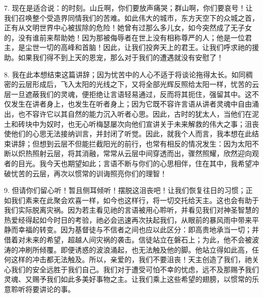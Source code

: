 7. 现在是适合说：的时刻。山丘啊，你们要放声痛哭；群山啊，你们要哀号！让我们召唤整个受造界同情我们的苦难。如此伟大的城市，东方天空下的众城之首，正有从文明世界中心被拔除的危险！她曾有过那么多儿女，如今突然成了无子女的，没有谁前来帮助她！因为那被侮辱者在世上没有相称尊严的人；他是一位君主，是尘世一切的高峰和首脑！因此，让我们投奔天上的君王。让我们呼求祂的援助。如果我们得不到上天的恩宠，那么对于我们的遭遇就没有安慰了！\par

8. 我在此本想结束这篇讲辞；因为忧苦中的人心不适于将谈论拖得太长。如同稠密的云层形成后，飞入太阳的光线之下，又将全部光辉反照给太阳一样，忧苦的云层一旦遮蔽我们的灵魂，便拒绝让言语轻易通过，反而将其扼住，强留其中。这不仅发生在讲者身上，也发生在听者身上；因为它既不容许言语从讲者灵魂中自由涌出，也不容许它以其自然的能力沉入听者心思。因此，古时的犹太人，当他们在泥土和砖块中为奴时，也无心听梅瑟屡次向他们宣讲关于未来解救的伟大之事；沮丧使他们的心思无法接纳训言，并封闭了听觉。因此，就我个人而言，我本想在此结束讲辞；但想到云层不但能拦截阳光的前行，也常有相反的情况发生：因为太阳不断以炽热照射云层，将其消融，常常从云层中间穿透而出，骤然照耀，欣然迎向观者的目光。我今天也期望如此；言语不断与你们的心思相伴，住在其中，我希望冲破忧苦的云层，再次以惯常的训诲照亮你们的理智！\par

9. 但请你们留心听！暂且侧耳倾听！摆脱这沮丧吧！让我们恢复往日的习惯；正如我们素来在此聚会欢喜一样，如今也这样行，将一切交托给天主。这也会有助于我们实际脱离灾祸。因为若主看见祂的言语被用心聆听，并看见我们对神圣智慧的热爱经得起如今时日的考验，祂必会迅速再次扶起我们，从眼前的暴风雨中带来平静而幸福的转变。因为基督徒与不信者之间也应以此区分：即高贵地承当一切；并借着对未来的希望，超越人间灾祸的袭击。信徒站立在磐石上；为此，他不会被波涛的冲刷所倾覆。即便诱惑的波浪涌起，也无法触及他的脚。他站立得如此高，任何这样的冲击都无法触及。所以，亲爱的，我们不要沮丧！天主创造了我们，祂关心我们的安全远胜于我们自己。我们对于遭受可怕不幸的忧虑，远不及那赐予我们灵魂、又赐予我们如此多美好事物之主。让我们乘上这些希望的翅膀，以惯常的乐意聆听将要讲论的事。\par

